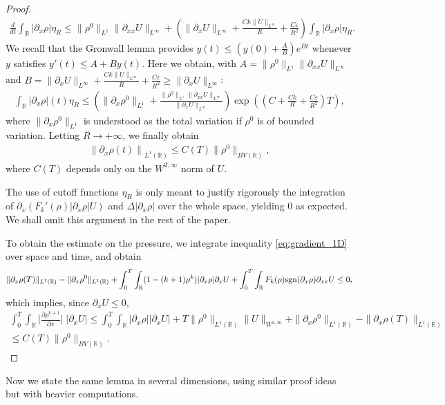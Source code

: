 \documentclass[11pt,twoside]{article}
\numberwithin{equation}{section}
\newcommand{\R}{\mathbb{R}}
\newcommand {\eps}  {\varepsilon}
\newcommand {\sgn} { {\rm sgn} }
\newcommand {\p}   {\partial}
\begin{document}
\begin{proof}
\begin{align*}
\frac{d}{dt} \int_{\R} |\p_x \rho |\eta_R \le \|\rho^0\|_{L^1}\|\p_{xx}U\|_{L^\infty} + \left(\|\p_xU\|_{L^\infty}+\frac{Ck\|U\|_{L^\infty}}{R}+\frac{C\eps}{R^2}\right) \int_{\R} |\p_x \rho | \eta_R.
\end{align*}
We recall that the Gronwall lemma provides $y(t)\leq \left(y(0)+\frac AB\right)e^{Bt}$ whenever $y$ satisfies $y'(t)\le A+By(t)$. Here we obtain, with $A=\|\rho^0\|_{L^1}\|\p_{xx}U\|_{L^\infty}$ and $B=\|\p_xU\|_{L^\infty}+\frac{Ck\|U\|_{L^\infty}}{R}+\frac{C\eps}{R^2}\geq \|\p_xU\|_{L^\infty}$:
\begin{align*}
\int_{\R} |\p_x \rho |(t) \eta_R \le \left(\|\p_x\rho^0\|_{L^1}+\frac{\|\rho^0\|_{L^1}\|\p_{xx}U\|_{L^\infty}}{\|\p_x U \|_{L^\infty}}\right)\exp \left( \left(C + \frac{Ck}{R}+\frac{C\eps}{R^2}\right)T \right),
\end{align*}
where $\|\p_x \rho^0\|_{L^1}$ is understood as the total variation if $\rho^0$ is of bounded variation. Letting $R \to + \infty$, we finally obtain
\begin{align*}
\left \| \p_x \rho (t) \right\|_{L^1(\R)} \le C(T)\|\rho^0\|_{BV(\R)},
\end{align*}
where $C(T)$ depends only on the $W^{2,\infty}$ norm of $U$.

The use of cutoff functions $\eta_R$ is only meant to justify rigorously the integration of $\p_x(F_k'(\rho)|\p_x\rho|U)$ and $\Delta |\p_x\rho |$ over the whole space, yielding $0$ as expected. We shall omit this argument in the rest of the paper. 

To obtain the estimate on the pressure, we integrate inequality \eqref{eq:gradient_1D} over space and time, and obtain
\begin{align*}
\| \p_x \rho (T) \|_{L^1(\R)} - \| \p_x \rho^0 \|_{L^1(\R)} + \int_0^T \int_{\R}(1-(k+1)\rho^k)|\p_x \rho | \p_x U + \int_0^T \int_{\R} F_k(\rho)\sgn(\p_x\rho)\p_{xx}U \le 0,
\end{align*}
which implies, since $\p_x U \le 0$,
\begin{align*}
\int_0^T\int_\R \big|\frac{\p \rho^{k+1}}{\p x } \big|\;   \big|{\partial_x} U\big| \le \int_0^T\int_{\R} | \p_x \rho | | \p_x U | + T \| \rho^0 \|_{L^1(\R)}\|U\|_{W^{2,\infty}} + \| \p_x \rho^0 \|_{L^1(\R)} - \| \p_x \rho (T) \|_{L^1(\R)} \\
\le C(T)\|\rho^0\|_{BV(\R)}.
\end{align*}
\end{proof}

Now we state the same lemma in several dimensions, using similar proof ideas but with heavier computations. 
\end{document}
